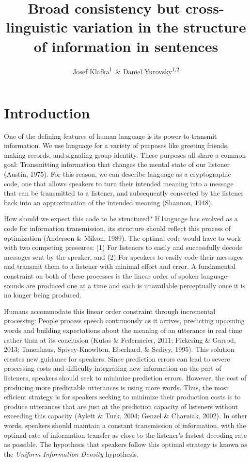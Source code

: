 \documentclass[
  english,
  man,floatsintext]{apa6}
\author{Josef Klafka\textsuperscript{1}\ \& Daniel Yurovsky\textsuperscript{1,2}}
\affiliation{
\vspace{0.5cm}
\textsuperscript{1} Carnegie Mellon University\\\textsuperscript{2} University of Chicago}
\title{Broad consistency but cross-linguistic variation in the structure of information in sentences}
\date{}
\begin{document}
\maketitle

\hypertarget{introduction}{%
\section{Introduction}\label{introduction}}

One of the defining features of human language is its power to transmit information. We use language for a variety of purposes like greeting friends, making records, and signaling group identity. These purposes all share a common goal: Transmitting information that changes the mental state of our listener (Austin, 1975). For this reason, we can describe language as a cryptographic code, one that allows speakers to turn their intended meaning into a message that can be transmitted to a listener, and subsequently converted by the listener back into an approximation of the intended meaning (Shannon, 1948).

How should we expect this code to be structured? If language has evolved as a code for information transmission, its structure should reflect this process of optimization (Anderson \& Milson, 1989). The optimal code would have to work with two competing pressures: (1) For listeners to easily and successfully decode messages sent by the speaker, and (2) For speakers to easily code their messages and transmit them to a listener with minimal effort and error. A fundamental constraint on both of these processes is the linear order of spoken language--sounds are produced one at a time and each is unavailable perceptually once it is no longer being produced.

Humans accommodate this linear order constraint through incremental processing: People process speech continuously as it arrives, predicting upcoming words and building expectations about the meaning of an utterance in real time rather than at its conclusion (Kutas \& Federmeier, 2011; Pickering \& Garrod, 2013; Tanenhaus, Spivey-Knowlton, Eberhard, \& Sedivy, 1995). This solution creates new guidance for speakers. Since prediction errors can lead to severe processing costs and difficulty integrating new information on the part of listeners, speakers should seek to minimize prediction errors. However, the cost of producing more predictable utterances is using more words. Thus, the most efficient strategy is for speakers seeking to minimize their production costs is to produce utterances that are just at the prediction capacity of listeners without exceeding this capacity (Aylett \& Turk, 2004; Genzel \& Charniak, 2002). In other words, speakers should maintain a constant transmission of information, with the optimal rate of information transfer as close to the listener's fastest decoding rate as possible. The hypothesis that speakers follow this optimal strategy is known as the \emph{Uniform Information Density} hypothesis.
\end{document}
